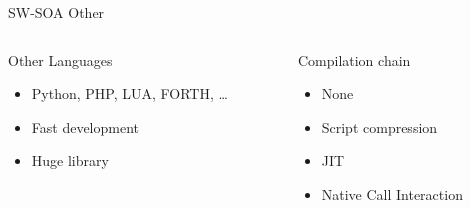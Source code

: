 %
\begin{Frame}{SW-SOA Other}
  \begin{columns}[t]
    \begin{column}{\BW} %
      \begin{block}{Other Languages}
        \begin{itemize}
        \item Python, PHP, LUA, FORTH, \ldots
        \item Fast development
        \item Huge library
        \end{itemize}
      \end{block} 
    \end{column}
    
    \begin{column}{\BW} %
      \begin{block}{Compilation chain}
        \begin{itemize}
        \item None
        \item Script compression
        \item JIT
        \item Native Call Interaction \TBD
        \end{itemize}
      \end{block}   
    \end{column}
  \end{columns}  
\end{Frame}



